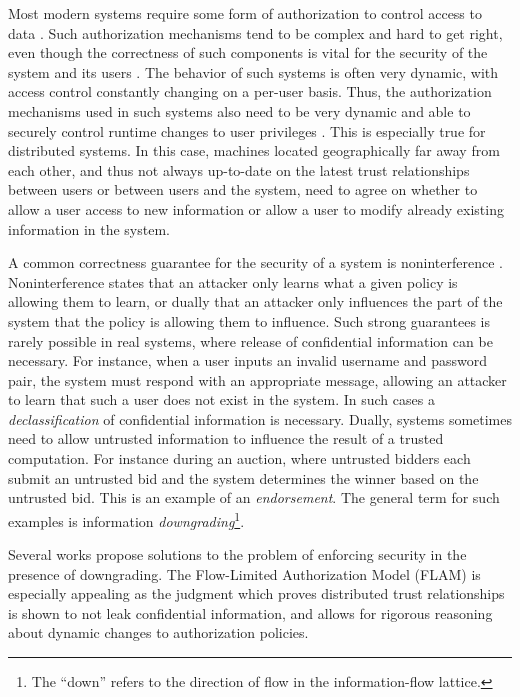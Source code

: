 Most modern systems require some form of authorization to control access to data \cite{Menezes:1996:HAC:548089}. Such authorization mechanisms tend to be complex and hard to get right, even though the correctness of such components is vital for the security of the system and its users \cite{Ferraiolo:1999:RAC:300830.300834}. The behavior of such systems is often very dynamic, with access control constantly changing on a per-user basis. Thus, the authorization mechanisms used in such systems also need to be very dynamic and able to securely control runtime changes to user privileges \cite{Ferraiolo:1999:RAC:300830.300834}.
This is especially true for distributed systems. In this case, machines located geographically far away from each other, and thus not always up-to-date on the latest trust relationships between users or between users and the system, need to agree on whether to allow a user access to new information or allow a user to modify already existing information in the system.

A common correctness guarantee for the security of a system is noninterference \cite{6234468}. Noninterference states that an attacker only learns what a given policy is allowing them to learn, or dually that an attacker only influences the part of the system that the policy is allowing them to influence. Such strong guarantees is rarely possible in real systems, where release of confidential information can be necessary. For instance, when a user inputs an invalid username and password pair, the system must respond with an appropriate message, allowing an attacker to learn that such a user does not exist in the system. In such cases a \emph{declassification} of confidential information is necessary. Dually, systems sometimes need to allow untrusted information to influence the result of a trusted computation. For instance during an auction, where untrusted bidders each submit an untrusted bid and the system determines the winner based on the untrusted bid. This is an example of an \emph{endorsement}. The general term for such examples is information \emph{downgrading}\footnote{The ``down'' refers to the direction of flow in the information-flow lattice.}.

Several works \cite{Efstathopoulos:2005:LEP:1095810.1095813, Krohn:2007:IFC:1294261.1294293, Arden:2015:FA:2859845.2859998, Hicks05dynamicupdating} propose solutions to the problem of enforcing security in the presence of downgrading. The Flow-Limited Authorization Model (FLAM) \cite{Arden:2015:FA:2859845.2859998} is especially appealing as the judgment which proves distributed trust relationships is shown to not leak confidential information, and allows for rigorous reasoning about dynamic changes to authorization policies.

